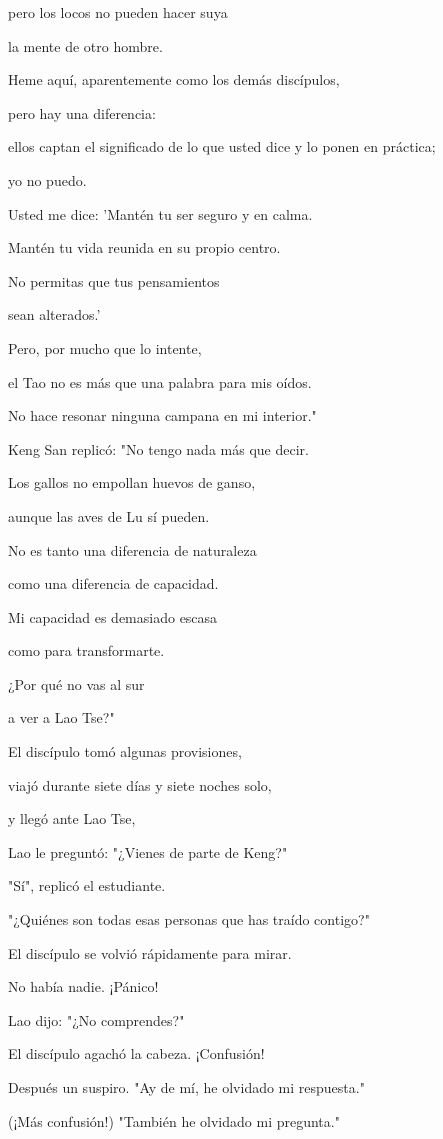 pero los locos no pueden hacer suya

la mente de otro hombre.

Heme aquí, aparentemente como los demás discípulos,

pero hay una diferencia:

ellos captan el significado de lo que usted dice y lo ponen en práctica;

yo no puedo.

Usted me dice: 'Mantén tu ser seguro y en calma.

Mantén tu vida reunida en su propio centro.

No permitas que tus pensamientos

sean alterados.'

Pero, por mucho que lo intente,

el Tao no es más que una palabra para mis oídos.

No hace resonar ninguna campana en mi interior."

Keng San replicó: "No tengo nada más que decir.

Los gallos no empollan huevos de ganso,

aunque las aves de Lu sí pueden.

No es tanto una diferencia de naturaleza

como una diferencia de capacidad.

Mi capacidad es demasiado escasa

como para transformarte.

¿Por qué no vas al sur

a ver a Lao Tse?"

El discípulo tomó algunas provisiones,

viajó durante siete días y siete noches solo,

y llegó ante Lao Tse,

Lao le preguntó: "¿Vienes de parte de Keng?"

"Sí", replicó el estudiante.

"¿Quiénes son todas esas personas que has traído contigo?"

El discípulo se volvió rápidamente para mirar.

No había nadie. ¡Pánico!

Lao dijo: "¿No comprendes?"

El discípulo agachó la cabeza. ¡Confusión!

Después un suspiro. "Ay de mí, he olvidado mi respuesta."

(¡Más confusión!) "También he olvidado mi pregunta."

